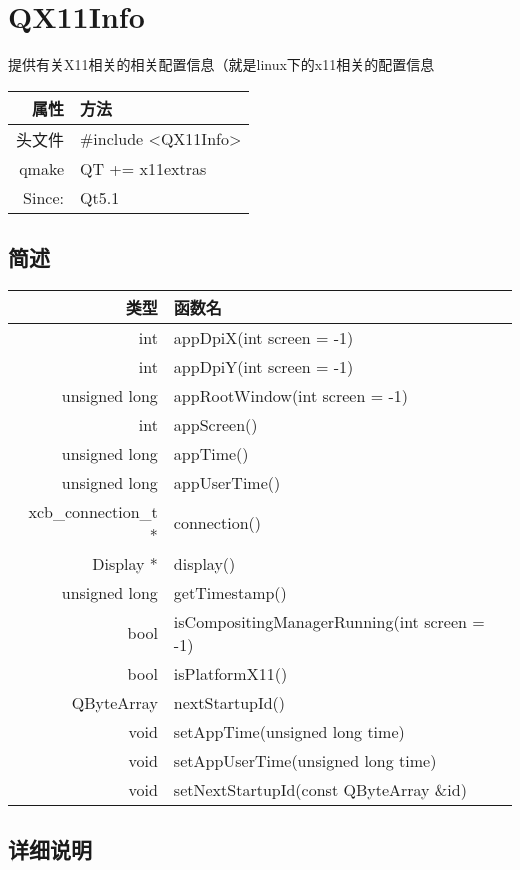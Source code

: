 \chapter{QX11Info}

提供有关X11相关的相关配置信息（就是linux下的x11相关的配置信息

\begin{tabular}{|r|l|}
	\hline
	属性 & 方法 \\
	\hline
	头文件 & \#include <QX11Info>\\      
	\hline
	qmake & QT += x11extras\\      
	\hline
    Since: & Qt5.1\\
    \hline
\end{tabular}


\section{简述}

\begin{tabular}{|r|l|}
\hline
类型 & 函数名 \\
\hline
int	& appDpiX(int screen = -1)\\
\hline
int	& appDpiY(int screen = -1) \\
\hline
unsigned long&	appRootWindow(int screen = -1) \\
\hline
int	&appScreen() \\
\hline
unsigned long&	appTime() \\ 
\hline
unsigned long&	appUserTime() \\
\hline
xcb\_connection\_t *	& connection() \\ 
\hline
Display *	&display()\\
\hline
unsigned long &	getTimestamp()\\
\hline
bool &	isCompositingManagerRunning(int screen = -1)\\
\hline
bool &	isPlatformX11() \\ 
\hline
QByteArray	& nextStartupId() \\
\hline
void &	setAppTime(unsigned long time)\\
\hline
void&	setAppUserTime(unsigned long time)\\
\hline
void&	setNextStartupId(const QByteArray \&id)\\
\hline
\end{tabular}

\section{详细说明}


